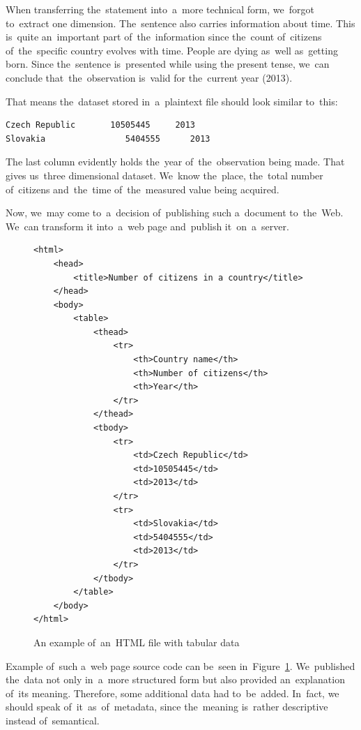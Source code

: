 \begin{sloppypar}
When transferring the~statement into~a~more technical form, we~forgot to~extract one
dimension. The~sentence also carries information about time. This is~quite an~important
part of~the~information since the~count of~citizens of~the~specific country evolves with time.
People are dying as~well as~getting born. Since the~sentence is~presented while using the
present tense, we~can conclude that~the~observation is~valid for the~current year (2013).
\end{sloppypar}

That means the~dataset stored in~a~plaintext file should look similar to~this:

\begin{verbatim}
Czech Republic       10505445     2013
Slovakia	            5404555      2013
\end{verbatim}

The last column evidently holds the~year of~the~observation being made.
That gives us~three dimensional dataset. We~know the~place, the~total number of~citizens and~the~time of~the~measured value being acquired.

Now, we~may come to~a~decision of~publishing such a~document to~the~Web. We~can transform
it into~a~web page and~publish it~on~a~server.
\begin{figure}
\small\begin{verbatim}
<html>
    <head>
        <title>Number of citizens in a country</title>
    </head>
    <body>
        <table>
            <thead>
                <tr>
                    <th>Country name</th>
                    <th>Number of citizens</th>
                    <th>Year</th>
                </tr>
            </thead>
            <tbody>
                <tr>
                    <td>Czech Republic</td>
                    <td>10505445</td>
                    <td>2013</td>
                </tr>
                <tr>
                    <td>Slovakia</td>
                    <td>5404555</td>
                    <td>2013</td>
                </tr>
            </tbody>
        </table>
    </body>
</html>
\end{verbatim}\normalsize
\caption{An example of~an~HTML file with tabular data}
\label{fig:rdf-html-01}
\end{figure}

Example of~such a~web page source code can be~seen in~Figure~\ref{fig:rdf-html-01}. We~published the~data not only in~a~more structured form but also
provided an~explanation of~its meaning. Therefore, some additional data had to~be~added. In~fact, we
should speak of~it~as~of~metadata, since the~meaning is~rather descriptive instead of~semantical.

